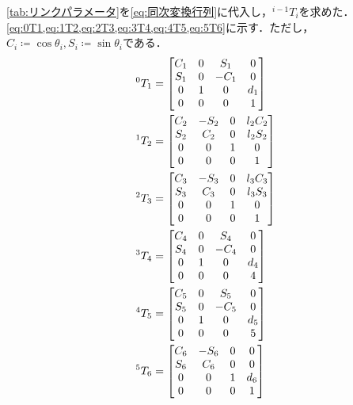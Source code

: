 \documentclass{ltjsarticle}
\begin{document}
\cref{tab:リンクパラメータ}を\cref{eq:同次変換行列}に代入し，$^{i-1}T_i$を求めた．\cref{eq:0T1,eq:1T2,eq:2T3,eq:3T4,eq:4T5,eq:5T6}に示す．ただし，$C_i \coloneqq \cos \theta_i, S_i \coloneqq \sin \theta_i$である．
\begin{align}
	\label{eq:0T1}
	^0T_1 &= \mqty[
		C_1 & 0 & S_1 & 0 \\
		S_1 & 0 & -C_1 & 0 \\
		0 & 1 & 0 & d_1 \\
		0 & 0 & 0 & 1 
	]
	\\
	\label{eq:1T2}
	^1T_2 &= \mqty[
		C_2 & -S_2 & 0 & l_2 C_2 \\
		S_2 & C_2 & 0 & l_2 S_2 \\
		0 & 0 & 1 & 0 \\
		0 & 0 & 0 & 1 
	]
	\\
	\label{eq:2T3}
	^2T_3 &= \mqty[
		C_3 & -S_3 & 0 & l_3 C_3 \\
		S_3 & C_3 & 0 & l_3 S_3 \\
		0 & 0 & 1 & 0 \\
		0 & 0 & 0 & 1 
	]
	\\
	\label{eq:3T4}
	^3T_4 &= \mqty[
		C_4 & 0 & S_4 & 0 \\
		S_4 & 0 & -C_4 & 0 \\
		0 & 1 & 0 & d_4 \\
		0 & 0 & 0 & 4 
	]
	\\
	\label{eq:4T5}
	^4T_5 &= \mqty[
		C_5 & 0 & S_5 & 0 \\
		S_5 & 0 & -C_5 & 0 \\
		0 & 1 & 0 & d_5 \\
		0 & 0 & 0 & 5 
	]
	\\
	\label{eq:5T6}
	^5T_6 &= \mqty[
		C_6 & -S_6 & 0 & 0 \\
		S_6 & C_6 & 0 & 0 \\
		0 & 0 & 1 & d_6 \\
		0 & 0 & 0 & 1
	]
\end{align}
\end{document}
